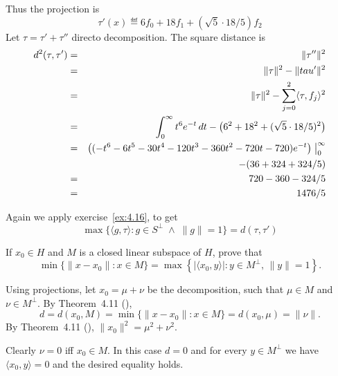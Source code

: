 \begin{enumerate}
Thus the projection is
\begin{equation*}
\tau'(x) \eqdef 6 f_0 + 18 f_1 + (\sqrt{5}\cdot 18/5) f_2
\end{equation*}
Let \(\tau = \tau' + \tau''\) directo decomposition.
The square distance is
\begin{eqnarray*}
d^2(\tau,\tau')
&=& \|\tau''\|^2 \\
&=& \|\tau\|^2 - \|tau'\|^2 \\
&=& \|\tau\|^2 - \sum_{j=0}^2 \langle \tau, f_j \rangle^2 \\
&=& \int_0^\infty t^6 e^{-t} \,dt
    - \bigl(6^2 + 18^2 +  (\sqrt{5}\cdot 18/5)^2\bigr) \\
&=& \left((-t^6 -6t^5 - 30t^4 - 120 t^3
          - 360t^2 -720t - 720)e^{-t}\right) \bigm|_0^\infty  \\
& & - (36 + 324 + 324/5) \\
&=& 720 - 360 - 324/5 \\
&=&  1476/5
\end{eqnarray*}



Again we apply exercise~\ref{ex:4.16}, to get
\begin{equation*}
\max \{\langle g, \tau\rangle : g\in S^\perp\;\wedge\; \|g\|=1\}
= d(\tau,\tau')
\end{equation*}



\begin{excopy}
If \label{ex:4.16}
\(x_0\in H\) and $M$ is a closed linear subspace  of $H$, prove that
\begin{equation*}
 \min \bigl\{\|x - x_0\|: x\in M\bigr\}
 = \max \left\{|\langle x_0,y\rangle|: y\in M^\perp,\, \|y\|=1\right\}.
\end{equation*}
\end{excopy}

Using projections,
let \(x_0 = \mu + \nu\) be the decomposition,
such that \(\mu\in M\) and \(\nu \in M^\perp\).
By Theorem~4.11 (\cite{RudinRCA87}),
\begin{equation*}
d = d(x_0,M) = \min \bigl\{\|x - x_0\|: x\in M\bigr\} = d(x_0,\mu) = \|\nu\|.
\end{equation*}
By Theorem~4.11 (\cite{RudinRCA87}),
\(\|x_0\|^2 = \mu^2 + \nu^2\).

Clearly \(\nu = 0\) iff \(x_0 \in M\). In this case \(d=0\)
and for every \(y\in M^\perp\) we have \(\langle x_0, y\rangle = 0\)
and the desired equality holds.


\end{enumerate}
